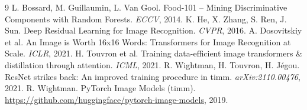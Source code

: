 \begin{thebibliography}{9}
 L. Bossard, M. Guillaumin, L. Van Gool. Food-101 -- Mining Discriminative Components with Random Forests. \emph{ECCV}, 2014.
 K. He, X. Zhang, S. Ren, J. Sun. Deep Residual Learning for Image Recognition. \emph{CVPR}, 2016.
 A. Dosovitskiy et al. An Image is Worth 16x16 Words: Transformers for Image Recognition at Scale. \emph{ICLR}, 2021.
 H. Touvron et al. Training data-efficient image transformers \& distillation through attention. \emph{ICML}, 2021.
 R. Wightman, H. Touvron, H. Jégou. ResNet strikes back: An improved training procedure in timm. \emph{arXiv:2110.00476}, 2021.
 R. Wightman. PyTorch Image Models (timm). \url{https://github.com/huggingface/pytorch-image-models}, 2019.
\end{thebibliography}
